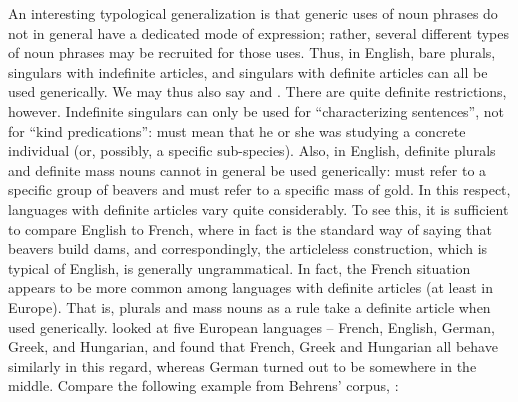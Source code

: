 An interesting typological generalization is that generic uses of noun phrases do not in general have a dedicated mode of expression; rather, several different types of noun phrases may be recruited for those uses. Thus, in English, bare plurals, singulars with indefinite articles, and singulars with definite articles can all be used generically. We may thus also say  and . There are quite definite restrictions, however. Indefinite singulars can only be used for “characterizing sentences”, not for “kind predications”: must mean that he or she was studying a concrete individual (or, possibly, a specific sub-species). Also, in English, definite plurals and definite mass nouns cannot in\textbf{ }general be used generically:  must refer to a specific group of beavers and  must refer to a specific mass of gold. In this respect, languages with definite articles vary quite considerably. To see this, it is sufficient to compare English to French, where in fact  is the standard way of saying that beavers build dams, and correspondingly, the articleless construction, which is typical of English, is generally ungrammatical. In fact, the French situation appears to be more common among languages with definite articles (at least in Europe). That is, plurals and mass nouns as a rule take a definite article when used generically. \citet{Behrens2005} looked at five European languages – French, English, German, Greek, and Hungarian, and found that French, Greek and Hungarian all behave similarly in this regard, whereas German turned out to be somewhere in the middle. Compare the following example from Behrens’ corpus, :


\item 


\item 


